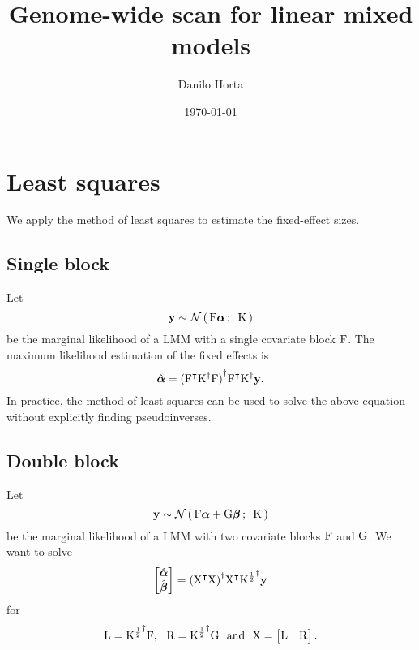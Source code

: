 \documentclass[twocolumn,draft]{article}
\title{Genome-wide scan for linear mixed models}
\author{Danilo Horta}
\date{\today}
\begin{document}
	\maketitle

\section{Least squares}

We apply the method of least squares to estimate the fixed-effect sizes.

\subsection{Single block}

Let
\begin{equation}\label{eq:lmm}
  \mathbf{y} \sim \mathcal{N}\left(\, {\mathrm{F}\boldsymbol{\alpha}} \,;\,~{\mathrm{K}} \,\right)
\end{equation}
be the marginal likelihood of a LMM with a single covariate block $\mathrm{F}$.
The maximum likelihood estimation of the fixed effects is
\begin{equation*}
	\hat{\boldsymbol{\alpha}} = {({\mathrm{F}}^\intercal{\mathrm{K}}^{\dagger}\mathrm{F})}^{\dagger}
	               {\mathrm{F}}^\intercal{\mathrm{K}}^{\dagger}\mathbf{y}.
\end{equation*}
In practice, the method of least squares can be used to solve the above
equation without explicitly finding pseudoinverses.

\subsection{Double block}

Let
\begin{equation*}
  \mathbf{y} \sim \mathcal{N}\left(\, {\mathrm{F}\boldsymbol{\alpha} + \mathrm{G}\boldsymbol{\beta}} \,;\,~{\mathrm{K}} \,\right)
\end{equation*}
be the marginal likelihood of a LMM with two covariate blocks $\mathrm{F}$ and
$\mathrm{G}$.
We want to solve
\begin{equation*}
	\begin{bmatrix}
		\hat{\boldsymbol{\alpha}} \\
		\hat{\boldsymbol{\beta}}
	\end{bmatrix} = {({\mathrm{X}}^\intercal\mathrm{X})}^{\dagger}{\mathrm{X}}^\intercal{\mathrm{K}^{\frac{1}{2}}}^{\dagger}\mathbf{y}
\end{equation*}
for
\begin{equation*}
\mathrm{L} = {\mathrm{K}^{\frac{1}{2}}}^{\dagger}\mathrm{F},~~ \mathrm{R} = {\mathrm{K}^{\frac{1}{2}}}^{\dagger}\mathrm{G}~~\text{and}~~
	\mathrm{X} =
		\begin{bmatrix}
			\mathrm{L} & \mathrm{R}
		\end{bmatrix}.
\end{equation*}
\end{document}
